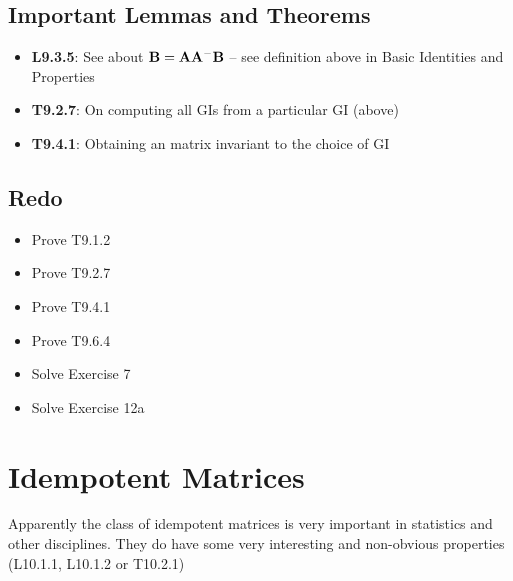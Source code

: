\documentclass[a4paper, oneside]{book}
\begin{document}
\section*{Important Lemmas and Theorems}
\begin{itemize}
\item \textbf{L9.3.5}: See about $\mathbf{B=AA^-B}$ -- see definition above in Basic Identities and Properties
\item \textbf{T9.2.7}: On computing all GIs from a particular GI (above)
\item \textbf{T9.4.1}: Obtaining an matrix invariant to the choice of GI
\end{itemize}


\section*{Redo}
\begin{itemize}
\item Prove T9.1.2
\item Prove T9.2.7
\item Prove T9.4.1
\item Prove T9.6.4
\item Solve Exercise 7
\item Solve Exercise 12a
\end{itemize}








\chapter{Idempotent Matrices}
Apparently the class of idempotent matrices is very important in statistics and other disciplines. They do have some very interesting and non-obvious properties (\eg L10.1.1, L10.1.2 or T10.2.1)
\end{document}

